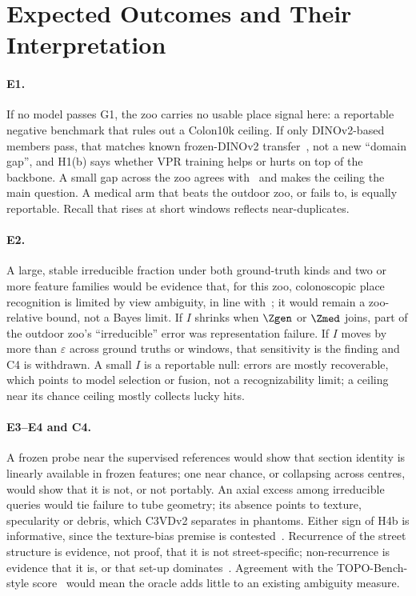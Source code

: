 \section{Expected Outcomes and Their Interpretation}
\label{sec:outcomes}

\paragraph{E1.} If no model passes G1, the zoo carries no usable place
signal here: a reportable negative benchmark that rules out a Colon10k
ceiling. If only DINOv2-based members pass, that matches known frozen-DINOv2
transfer~\cite{dermyer2025endodino,huix2024natural}, not a new ``domain
gap'', and H1(b) says whether VPR training helps or hurts on top of the
backbone. A small gap across the zoo agrees
with~\cite{morlana2021selfsupervised} and makes the ceiling the main
question. A medical arm that beats the outdoor zoo, or fails to, is equally
reportable. Recall that rises at short windows reflects near-duplicates.

\paragraph{E2.} A large, stable irreducible fraction under both ground-truth
kinds and two or more feature families would be evidence that, for this
zoo, colonoscopic place recognition is limited by view ambiguity, in line
with~\cite{jiang2025c3vdreg}; it would remain a zoo-relative bound, not a
Bayes limit. If $I$ shrinks when $\Zgen$ or $\Zmed$ joins, part of the
outdoor zoo's ``irreducible'' error was representation failure. If $I$ moves
by more than $\varepsilon$ across ground truths or windows, that sensitivity
is the finding and C4 is withdrawn. A small $I$ is a reportable null: errors
are mostly recoverable, which points to model selection or fusion, not a
recognizability limit; a ceiling near its chance ceiling mostly collects
lucky hits.

\paragraph{E3--E4 and C4.} A frozen probe near the supervised references
would show that section identity is linearly available in frozen features;
one near chance, or collapsing across centres, would show that it is not,
or not portably. An axial excess
among irreducible queries would tie failure to tube geometry; its absence
points to texture, specularity or debris, which C3VDv2 separates in
phantoms. Either sign of H4b is informative, since the texture-bias premise
is contested~\cite{burgert2025imagenettrained}. Recurrence of the street
structure is evidence, not proof, that it is not street-specific;
non-recurrence is evidence that it is, or that set-up
dominates~\cite{schubert2021makes}. Agreement with the TOPO-Bench-style
score~\cite{wang2025topobench} would mean the oracle adds little to an
existing ambiguity measure.
